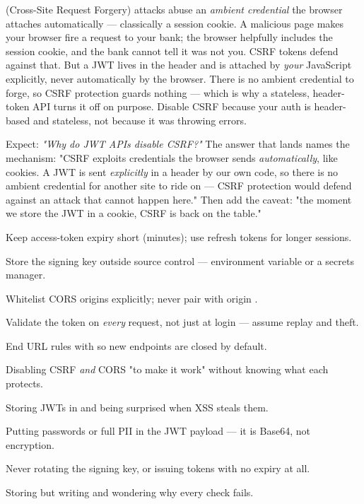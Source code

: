   (Cross-Site Request Forgery) attacks abuse an \emph{ambient credential} the browser attaches automatically --- classically a session cookie. A malicious page makes your browser fire a request to your bank; the browser helpfully includes the session cookie, and the bank cannot tell it was not you. CSRF tokens defend against that. But a JWT lives in the  header and is attached by \emph{your} JavaScript explicitly, never automatically by the browser. There is no ambient credential to forge, so CSRF protection guards nothing --- which is why a stateless, header-token API turns it off on purpose. Disable CSRF because your auth is header-based and stateless, not because it was throwing errors.

\begin{interview}
Expect: \emph{"Why do JWT APIs disable CSRF?"} The answer that lands names the mechanism: "CSRF exploits credentials the browser sends \emph{automatically}, like cookies. A JWT is sent \emph{explicitly} in a header by our own code, so there is no ambient credential for another site to ride on --- CSRF protection would defend against an attack that cannot happen here." Then add the caveat: "the moment we store the JWT in a cookie, CSRF is back on the table."
\end{interview}

\begin{bestpractices}
\begin{wbitem}
  \item Keep access-token expiry short (minutes); use refresh tokens for longer sessions.
  \item Store the signing key outside source control --- environment variable or a secrets manager.
  \item Whitelist CORS origins explicitly; never pair  with origin \code{*}.
  \item Validate the token on \emph{every} request, not just at login --- assume replay and theft.
  \item End URL rules with  so new endpoints are closed by default.
\end{wbitem}
\end{bestpractices}
\begin{mistakes}
\begin{wbitem}
  \item Disabling CSRF \emph{and} CORS "to make it work" without knowing what each protects.
  \item Storing JWTs in  and being surprised when XSS steals them.
  \item Putting passwords or full PII in the JWT payload --- it is Base64, not encryption.
  \item Never rotating the signing key, or issuing tokens with no expiry at all.
  \item Storing  but writing  and wondering why every check fails.
\end{wbitem}
\end{mistakes}

